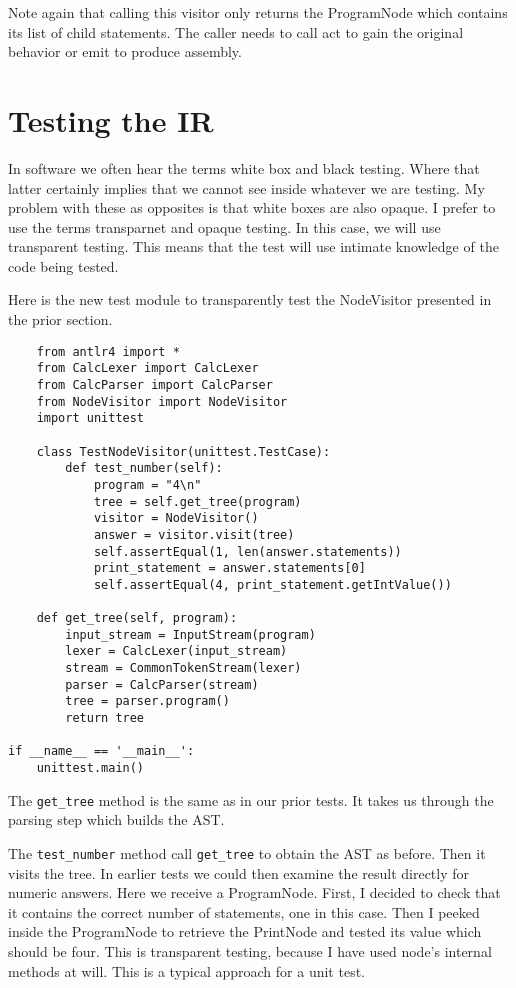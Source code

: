 Note again that calling this visitor only returns the ProgramNode
which contains its list of child statements. The caller needs
to call act to gain the original behavior or emit to produce assembly.

\section{Testing the IR}

In software we often hear the terms white box and black testing.
Where that latter certainly implies that we cannot see inside whatever
we are testing. My problem with these as opposites is that white
boxes are also opaque. I prefer to use the terms transparnet and opaque
testing. In this case, we will use transparent testing. This means
that the test will use intimate knowledge of the code being tested.

Here is the new test module to transparently test the NodeVisitor
presented in the prior section.

{\footnotesize
\begin{verbatim}
    from antlr4 import *
    from CalcLexer import CalcLexer
    from CalcParser import CalcParser
    from NodeVisitor import NodeVisitor
    import unittest

    class TestNodeVisitor(unittest.TestCase):
        def test_number(self):
            program = "4\n"
            tree = self.get_tree(program)
            visitor = NodeVisitor()
            answer = visitor.visit(tree)
            self.assertEqual(1, len(answer.statements))
            print_statement = answer.statements[0]
            self.assertEqual(4, print_statement.getIntValue())

    def get_tree(self, program):
        input_stream = InputStream(program)
        lexer = CalcLexer(input_stream)
        stream = CommonTokenStream(lexer)
        parser = CalcParser(stream)
        tree = parser.program()
        return tree

if __name__ == '__main__':
    unittest.main()
\end{verbatim}
}

The \verb+get_tree+ method is the same as in our prior tests. It takes
us through the parsing step which builds the AST.

The \verb+test_number+ method call \verb+get_tree+ to obtain the AST
as before. Then it visits the tree. In earlier tests we could then
examine the result directly for numeric answers. Here we receive
a ProgramNode. First, I decided to check that it contains the correct
number of statements, one in this case. Then I peeked inside
the ProgramNode to retrieve the PrintNode and tested its value
which should be four. This is transparent testing, because I have
used node's internal methods at will. This is a typical approach
for a unit test.

